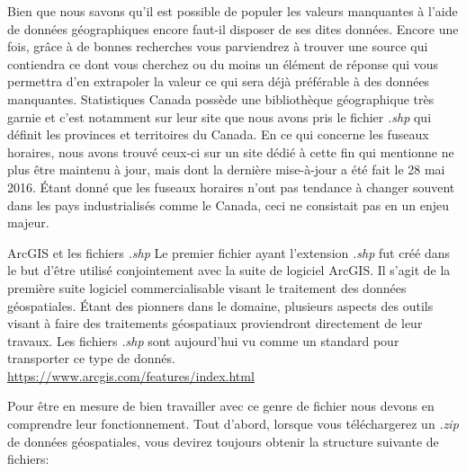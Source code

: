 \noindent
Bien que nous savons qu'il est possible de populer les valeurs manquantes à l'aide de données géographiques encore faut-il disposer de ses dites données. Encore une fois, grâce à de bonnes recherches vous parviendrez à trouver une source qui contiendra ce dont vous cherchez ou du moins un élément de réponse qui vous permettra d'en extrapoler la valeur ce qui sera déjà préférable à des données manquantes. Statistiques Canada possède une bibliothèque géographique très garnie et c'est notamment sur leur site que nous avons pris le fichier \emph{.shp} qui définit les provinces et territoires du Canada. \cite{Data:BoundaryFiles} En ce qui concerne les fuseaux horaires, nous avons trouvé ceux-ci sur un site dédié à cette fin qui mentionne ne plus être maintenu à jour, mais dont la dernière mise-à-jour a été fait le 28 mai 2016. Étant donné que les fuseaux horaires n'ont pas tendance à changer souvent dans les pays industrialisés comme le Canada, ceci ne consistait pas en un enjeu majeur. \cite{Data:tzWorlwide} \\

\begin{moreInfo}{ArcGIS et les fichiers \emph{.shp}}
	Le premier fichier ayant l'extension \emph{.shp} fut créé dans le but d'être utilisé conjointement avec la suite de logiciel ArcGIS. Il s'agit de la première suite logiciel commercialisable visant le traitement des données géospatiales. Étant des pionners dans le domaine, plusieurs aspects des outils visant à faire des traitements géospatiaux proviendront directement de leur travaux. Les fichiers \emph{.shp} sont aujourd'hui vu comme un standard pour transporter ce type de donnés. \\
\url{https://www.arcgis.com/features/index.html}
\end{moreInfo}

\noindent
Pour être en mesure de bien travailler avec ce genre de fichier nous devons en comprendre leur fonctionnement. Tout d'abord, lorsque vous téléchargerez un \emph{.zip} de données géospatiales, vous devirez toujours obtenir la structure suivante de fichiers: \\


